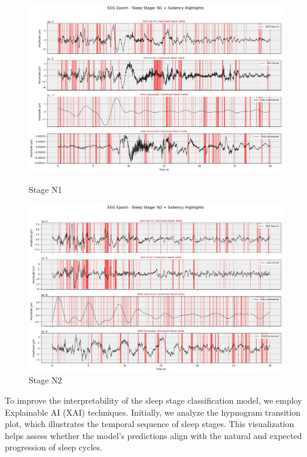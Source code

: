 \begin{figure}[H]
	\centering
	\begin{minipage}[b]{0.45\linewidth}
		\includegraphics[width=\linewidth]{"img/paper_3/stage n1"}
		\caption{Stage N1}
		\label{fig:stage-n1}
	\end{minipage}
	\hfill
	\begin{minipage}[b]{0.45\linewidth}
		\includegraphics[width=\linewidth]{"img/paper_3/stage n2"}
		\caption{Stage N2}
		\label{fig:stage-n2}
	\end{minipage}
\end{figure}




To improve the interpretability of the sleep stage classification model, we employ Explainable AI (XAI) techniques. Initially, we analyze the hypnogram transition plot, which illustrates the temporal sequence of sleep stages. This visualization helps assess whether the model's predictions align with the natural and expected progression of sleep cycles.



